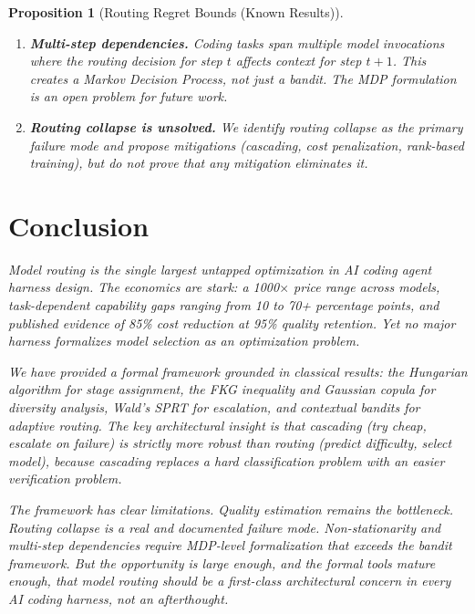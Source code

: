 \documentclass[11pt, a4paper, copyright]{googledeepmind}
\newtheorem{proposition}{Proposition}[section]
\begin{document}
\begin{proposition}[Routing Regret Bounds (Known Results)]
\begin{enumerate}
\item \textbf{Multi-step dependencies.} Coding tasks span multiple model invocations where the routing decision for step $t$ affects context for step $t+1$. This creates a Markov Decision Process, not just a bandit. The MDP formulation is an open problem for future work.

\item \textbf{Routing collapse is unsolved.} We identify routing collapse as the primary failure mode and propose mitigations (cascading, cost penalization, rank-based training), but do not prove that any mitigation eliminates it.
\end{enumerate}


\section{Conclusion}
\label{sec:conclusion}

Model routing is the single largest untapped optimization in AI coding agent harness design. The economics are stark: a 1000$\times$ price range across models, task-dependent capability gaps ranging from 10 to 70+ percentage points, and published evidence of 85\% cost reduction at 95\% quality retention. Yet no major harness formalizes model selection as an optimization problem.

We have provided a formal framework grounded in classical results: the Hungarian algorithm for stage assignment, the FKG inequality and Gaussian copula for diversity analysis, Wald's SPRT for escalation, and contextual bandits for adaptive routing. The key architectural insight is that cascading (try cheap, escalate on failure) is strictly more robust than routing (predict difficulty, select model), because cascading replaces a hard classification problem with an easier verification problem.

The framework has clear limitations. Quality estimation remains the bottleneck. Routing collapse is a real and documented failure mode. Non-stationarity and multi-step dependencies require MDP-level formalization that exceeds the bandit framework. But the opportunity is large enough, and the formal tools mature enough, that model routing should be a first-class architectural concern in every AI coding harness, not an afterthought.






\end{proposition}
\end{document}
